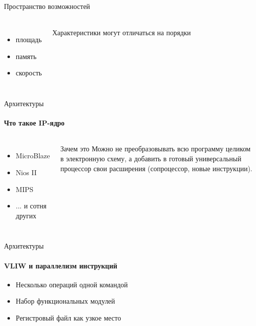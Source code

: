 \documentclass{beamer}              %
\begin{document}
\begin{frame}{Пространство возможностей}
  \framesubtitle{}
  
  \begin{columns}
      \begin{itemize}
      \item площадь
      \item память
      \item скорость
       \end{itemize}

      \begin{block}{}
          Характеристики могут отличаться на порядки
      \end{block}
  \end{columns}	
  
\end{frame}


\begin{frame}{Архитектуры}
  \framesubtitle{Что такое IP-ядро}
  
  \begin{columns}
      \begin{itemize}
          \item MicroBlaze
          \item Nios II
          \item MIPS
          \item ... и сотня других
  		\end{itemize}

      \begin{block}{Зачем это}
         Можно не преобразовывать всю программу целиком в электронную схему,
         а добавить в готовый универсальный процессор свои расширения (сопроцессор, новые инструкции).
      \end{block}
  \end{columns}	
\end{frame}

\begin{frame}{Архитектуры}
  \framesubtitle{VLIW и параллелизм инструкций}
  \begin{itemize}
          \item Несколько операций одной командой
          \item Набор функциональных модулей
          \item Регистровый файл как узкое место
  	\end{itemize}
\end{frame}
\end{document}
